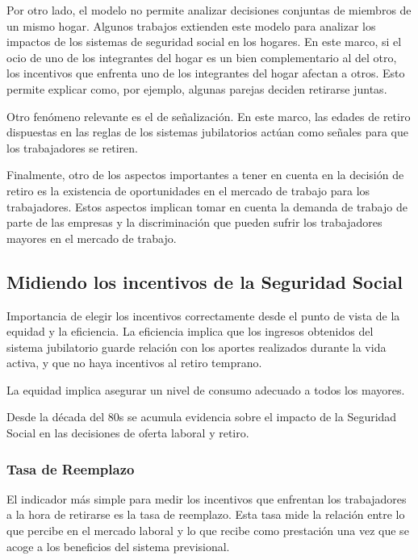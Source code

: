 \documentclass[]{article}
\begin{document}
Por otro lado, el modelo no permite analizar decisiones conjuntas de
miembros de un mismo hogar. Algunos trabajos extienden este modelo para
analizar los impactos de los sistemas de seguridad social en los
hogares. En este marco, si el ocio de uno de los integrantes del hogar
es un bien complementario al del otro, los incentivos que enfrenta uno
de los integrantes del hogar afectan a otros. Esto permite explicar
como, por ejemplo, algunas parejas deciden retirarse juntas.

Otro fenómeno relevante es el de señalización. En este marco, las edades
de retiro dispuestas en las reglas de los sistemas jubilatorios actúan
como señales para que los trabajadores se retiren.

Finalmente, otro de los aspectos importantes a tener en cuenta en la
decisión de retiro es la existencia de oportunidades en el mercado de
trabajo para los trabajadores. Estos aspectos implican tomar en cuenta
la demanda de trabajo de parte de las empresas y la discriminación que
pueden sufrir los trabajadores mayores en el mercado de trabajo.

\subsection{Midiendo los incentivos de la Seguridad
Social}\label{midiendo-los-incentivos-de-la-seguridad-social}

Importancia de elegir los incentivos correctamente desde el punto de
vista de la equidad y la eficiencia. La eficiencia implica que los
ingresos obtenidos del sistema jubilatorio guarde relación con los
aportes realizados durante la vida activa, y que no haya incentivos al
retiro temprano.

La equidad implica asegurar un nivel de consumo adecuado a todos los
mayores.

Desde la década del 80s se acumula evidencia sobre el impacto de la
Seguridad Social en las decisiones de oferta laboral y retiro.

\subsubsection{Tasa de Reemplazo}\label{tasa-de-reemplazo}

El indicador más simple para medir los incentivos que enfrentan los
trabajadores a la hora de retirarse es la tasa de reemplazo. Esta tasa
mide la relación entre lo que percibe en el mercado laboral y lo que
recibe como prestación una vez que se acoge a los beneficios del sistema
previsional.
\end{document}
